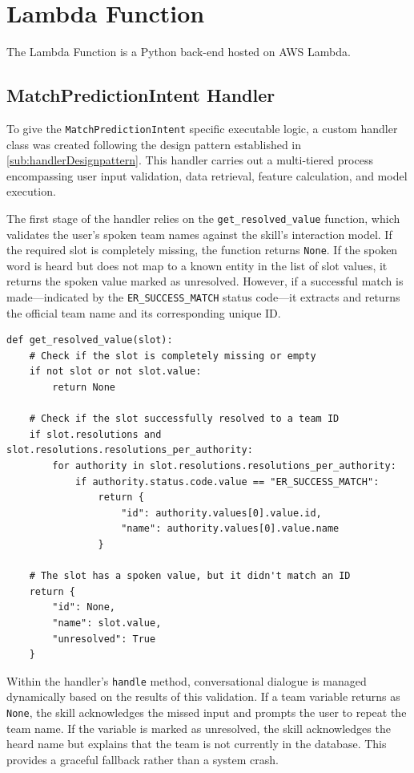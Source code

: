 \section{Lambda Function}
The Lambda Function is a Python back-end hosted on AWS Lambda.
\subsection{MatchPredictionIntent Handler}
\label{sub:slotValidation}
To give the \texttt{MatchPredictionIntent} specific executable logic, a custom handler class was created following the design pattern established in \autoref{sub:handlerDesignpattern}. This handler carries out a multi-tiered process encompassing user input validation, data retrieval, feature calculation, and model execution.

The first stage of the handler relies on the \texttt{get\_resolved\_value} function, which validates the user's spoken team names against the skill's interaction model. If the required slot is completely missing, the function returns \texttt{None}. If the spoken word is heard but does not map to a known entity in the list of slot values, it returns the spoken value marked as unresolved. However, if a successful match is made---indicated by the \texttt{ER\_SUCCESS\_MATCH} status code---it extracts and returns the official team name and its corresponding unique ID.

\begin{lstlisting}[style=code, caption={Helper function to resolve and validate user slot inputs.}]
def get_resolved_value(slot):
    # Check if the slot is completely missing or empty
    if not slot or not slot.value:
        return None 

    # Check if the slot successfully resolved to a team ID
    if slot.resolutions and slot.resolutions.resolutions_per_authority:
        for authority in slot.resolutions.resolutions_per_authority:
            if authority.status.code.value == "ER_SUCCESS_MATCH":
                return {
                    "id": authority.values[0].value.id,
                    "name": authority.values[0].value.name
                }
                
    # The slot has a spoken value, but it didn't match an ID
    return {
        "id": None, 
        "name": slot.value, 
        "unresolved": True
    }
\end{lstlisting}

Within the handler's \texttt{handle} method, conversational dialogue is managed dynamically based on the results of this validation. If a team variable returns as \texttt{None}, the skill acknowledges the missed input and prompts the user to repeat the team name. If the variable is marked as unresolved, the skill acknowledges the heard name but explains that the team is not currently in the database. This provides a graceful fallback rather than a system crash.

